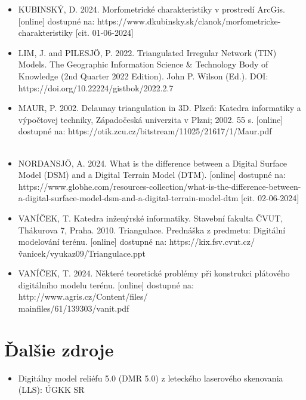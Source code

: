 \documentclass[12pt]{article}
\begin{document}
\begin{itemize}
    \item KUBINSKÝ, D. 2024. Morfometrické charakteristiky v prostredí ArcGis. [online] dostupné na: https://www.dkubinsky.sk/clanok/morfometricke-charakteristiky [cit. 01-06-2024]
    \item LIM, J. and PILESJÖ, P. 2022. Triangulated Irregular Network (TIN) Models. The Geographic Information Science & Technology Body of Knowledge (2nd Quarter 2022 Edition). John P. Wilson (Ed.).  DOI: https://doi.org/10.22224/gistbok/2022.2.7
    \item MAUR, P. 2002. Delaunay triangulation in 3D. Plzeň: Katedra informatiky a výpočtovej techniky, Západočeská univerzita v Plzni; 2002. 55 s. [online] dostupné na: https://otik.zcu.cz/bitstream/11025/21617/1/Maur.pdf \\\\
    \item NORDANSJÖ, A. 2024. What is the difference between a Digital Surface Model (DSM) and a Digital Terrain Model (DTM). [online] dostupné na: https://www.globhe.com/resources-collection/what-is-the-difference-between-a-digital-surface-model-dsm-and-a-digital-terrain-model-dtm [cit. 02-06-2024] 
    \item VANÍČEK, T. Katedra inženýrské informatiky. Stavební fakulta ČVUT, Thákurova 7, Praha. 2010. Triangulace. Prednáška z predmetu: Digitální modelování terénu. [online] dostupné na: https://kix.fsv.cvut.cz/\~vanicek/vyuka\textunderscore z09/Triangulace.ppt 
    \item VANÍČEK, T. 2024. Některé teoretické problémy při konstrukci plátového digitálního modelu terénu. [online] dostupné na: http://www.agris.cz/Content/files/\\main\textunderscore files/61/139303/vanit.pdf 
    
\end{itemize}

\section*{Ďalšie zdroje}
\begin{itemize}
    \item Digitálny model reliéfu 5.0 (DMR 5.0) z leteckého laserového skenovania (LLS): ÚGKK SR
\end{itemize}
\end{document}
